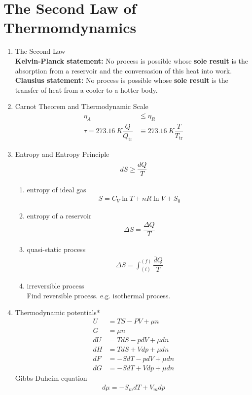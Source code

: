 \documentclass[10.5pt, a4paper, oneside]{article}
\numberwithin{equation}{section}%
\begin{document}
\section{The Second Law of Thermomdynamics}
\begin{multicols}{2}
	\begin{enumerate}
		\item The Second Law
			\\
			\textbf{Kelvin-Planck statement:}
			No process is possible whose \textbf{sole result} is the absorption from a reservoir and the conversasion of this heat into work.
			\\
			\textbf{Clausius statement:}
			No process is possible whose \textbf{sole result} is the transfer of heat from a cooler to a hotter body.
		\item Carnot Theorem and Thermodynamic Scale
			\begin{align}
				\eta_A &\leqslant \eta_R
				\\
				\tau = \SI{273.16}{K}\dfrac{Q}{Q_\text{tr}} &\equiv \SI{273.16}{K}\dfrac{T}{T_\text{tr}}
			\end{align}
		\item Entropy and Entropy Principle
		\begin{align}
			dS \geqslant \dfrac{\bar{d}Q}{T}
		\end{align}
			\begin{enumerate}
				\item entropy of ideal gas
				\begin{align}
					S = C_V\ln{T} + nR\ln{V} + S_0
				\end{align}
				\item entropy of a reservoir
				\begin{align}
					\Delta S = \dfrac{\Delta Q}{T}
				\end{align}
				\item quasi-static process
				\begin{align}
					\Delta S = \int^{(f)}_{(i)}\dfrac{\bar{d}Q}{T}
				\end{align}
				\item irreversible process\\
					Find reversible process. e.g. isothermal process.
			\end{enumerate}
		\item Thermodynamic potentials*
			\begin{align}
				U &= TS -PV + \mu n\\
				G &= \mu n\\
				dU &= TdS - pdV + \mu dn\\
				dH &= TdS + Vdp + \mu dn\\
				dF &= -SdT - pdV + \mu dn\\
				dG &= -SdT + Vdp + \mu dn
			\end{align}
			Gibbs-Duheim equation
			\begin{align}
				d\mu = -S_m dT + V_m dp
			\end{align}
	\end{enumerate}
\end{multicols}
\end{document}
